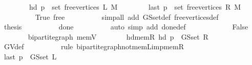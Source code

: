 \begin{isabellebody}
\isanewline
\ \ \ \ \ \ \ \ {\isachardoublequoteopen}hd\ p\ {\isasymin}\ set\ {\isacharparenleft}{\kern0pt}free{\isacharunderscore}{\kern0pt}vertices\ L\ M{\isacharparenright}{\kern0pt}{\isachardoublequoteclose}\isanewline
\ \ \ \ \ \ \ \ {\isachardoublequoteopen}last\ p\ {\isasymin}\ set\ {\isacharparenleft}{\kern0pt}free{\isacharunderscore}{\kern0pt}vertices\ R\ M{\isacharparenright}{\kern0pt}{\isachardoublequoteclose}\isanewline
\ \ \ \ \ \ \ \ \isamarkupfalse%
\ True\ free\isanewline
\ \ \ \ \ \ \ \ \isamarkupfalse%
\ {\isacharparenleft}{\kern0pt}simp{\isacharunderscore}{\kern0pt}all\ add{\isacharcolon}{\kern0pt}\ G{\isachardot}{\kern0pt}S{\isachardot}{\kern0pt}set{\isacharunderscore}{\kern0pt}def\ free{\isacharunderscore}{\kern0pt}vertices{\isacharunderscore}{\kern0pt}def{\isacharparenright}{\kern0pt}\isanewline
\ \ \ \ \ \ \isamarkupfalse%
\ {\isacharquery}{\kern0pt}thesis\isanewline
\ \ \ \ \ \ \ \ \isamarkupfalse%
\ done{\isacharunderscore}{\kern0pt}{}\isanewline
\ \ \ \ \ \ \ \ \isamarkupfalse%
\ {\isacharparenleft}{\kern0pt}auto\ simp\ add{\isacharcolon}{\kern0pt}\ done{\isacharunderscore}{\kern0pt}{}{\isacharunderscore}{\kern0pt}def{\isacharparenright}{\kern0pt}\isanewline
\ \ \ \ \isamarkupfalse%
\isanewline
\ \ \ \ \ \ \isamarkupfalse%
\ False\isanewline
\ \ \ \ \ \ \isamarkupfalse%
\ bipartite{\isacharunderscore}{\kern0pt}graph\ mem{\isacharunderscore}{\kern0pt}V{\isacharparenleft}{\kern0pt}{}{\isacharparenright}{\kern0pt}\isanewline
\ \ \ \ \ \ \isamarkupfalse%
\ hd{\isacharunderscore}{\kern0pt}mem{\isacharunderscore}{\kern0pt}R{\isacharcolon}{\kern0pt}\ {\isachardoublequoteopen}hd\ p\ {\isasymin}\ G{\isachardot}{\kern0pt}S{\isachardot}{\kern0pt}set\ R{\isachardoublequoteclose}\isanewline
\ \ \ \ \ \ \ \ \isamarkupfalse%
\ G{\isachardot}{\kern0pt}V{\isacharunderscore}{\kern0pt}def\isanewline
\ \ \ \ \ \ \ \ \isamarkupfalse%
\ {\isacharparenleft}{\kern0pt}rule\ bipartite{\isacharunderscore}{\kern0pt}graph{\isachardot}{\kern0pt}not{\isacharunderscore}{\kern0pt}mem{\isacharunderscore}{\kern0pt}L{\isacharunderscore}{\kern0pt}imp{\isacharunderscore}{\kern0pt}mem{\isacharunderscore}{\kern0pt}R{\isacharparenright}{\kern0pt}\isanewline
\ \ \ \ \ \ \isamarkupfalse%
\ {\isachardoublequoteopen}last\ p\ {\isasymin}\ G{\isachardot}{\kern0pt}S{\isachardot}{\kern0pt}set\ L{\isachardoublequoteclose}\isanewline
\ \ \ \ \ \ \isamarkupfalse%

\end{isabellebody}
